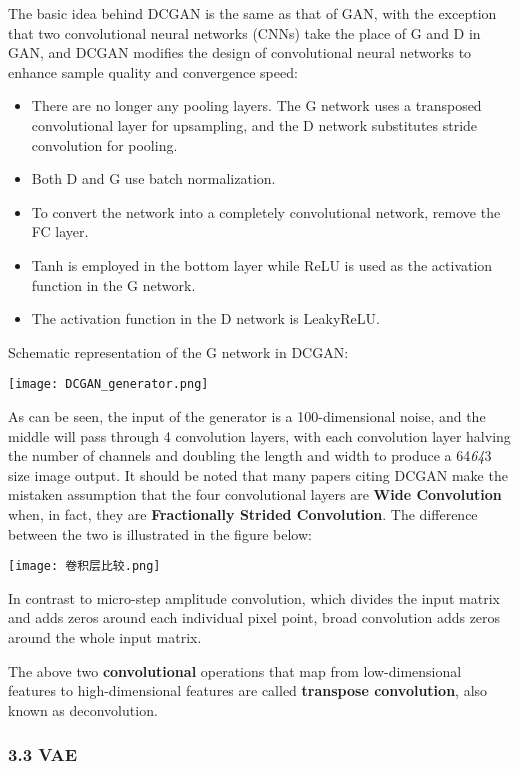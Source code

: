 \documentclass[
]{article}
\begin{document}
The basic idea behind DCGAN is the same as that of GAN, with the
exception that two convolutional neural networks (CNNs) take the place
of G and D in GAN, and DCGAN modifies the design of convolutional neural
networks to enhance sample quality and convergence speed:

\begin{itemize}
\item
  There are no longer any pooling layers. The G network uses a
  transposed convolutional layer for upsampling, and the D network
  substitutes stride convolution for pooling.
\item
  Both D and G use batch normalization.
\item
  To convert the network into a completely convolutional network, remove
  the FC layer.
\item
  Tanh is employed in the bottom layer while ReLU is used as the
  activation function in the G network.
\item
  The activation function in the D network is LeakyReLU.
\end{itemize}

Schematic representation of the G network in DCGAN:

\texttt{[image: DCGAN\_generator.png]}

As can be seen, the input of the generator is a 100-dimensional noise,
and the middle will pass through 4 convolution layers, with each
convolution layer halving the number of channels and doubling the length
and width to produce a 64\emph{64}3 size image output. It should be
noted that many papers citing DCGAN make the mistaken assumption that
the four convolutional layers are \textbf{Wide Convolution} when, in
fact, they are \textbf{Fractionally Strided Convolution}. The difference
between the two is illustrated in the figure below:

\texttt{[image: 卷积层比较.png]}

In contrast to micro-step amplitude convolution, which divides the input
matrix and adds zeros around each individual pixel point, broad
convolution adds zeros around the whole input matrix.

The above two \textbf{convolutional} operations that map from
low-dimensional features to high-dimensional features are called
\textbf{transpose convolution}, also known as deconvolution.

\hypertarget{33-vae}{%
\subsubsection{3.3 VAE}\label{33-vae}}
\end{document}
